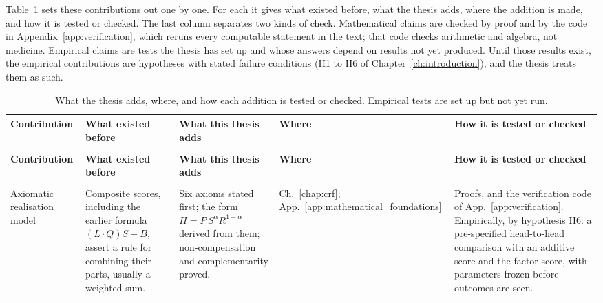 Table~\ref{tab:guide-novelty} sets these contributions out one by one. For
each it gives what existed before, what the thesis adds, where the addition is
made, and how it is tested or checked. The last column separates two kinds of
check. Mathematical claims are checked by proof and by the code in
Appendix~\ref{app:verification}, which reruns every computable statement in the
text; that code checks arithmetic and algebra, not medicine. Empirical claims
are tests the thesis has set up and whose answers depend on results not yet
produced. Until those results exist, the empirical contributions are
hypotheses with stated failure conditions (H1 to H6 of
Chapter~\ref{ch:introduction}), and the thesis treats them as such.

\begingroup
\footnotesize
\setlength{\tabcolsep}{4pt}
\renewcommand{\arraystretch}{1.2}
\begin{longtable}{>{\raggedright\arraybackslash}p{2.4cm} >{\raggedright\arraybackslash}p{3.0cm} >{\raggedright\arraybackslash}p{3.6cm} >{\raggedright\arraybackslash}p{1.4cm} >{\raggedright\arraybackslash}p{3.7cm}}
\caption{What the thesis adds, where, and how each addition is tested or checked. Empirical tests are set up but not yet run.}
\label{tab:guide-novelty}\\
\toprule
\textbf{Contribution} & \textbf{What existed before} & \textbf{What this thesis adds} & \textbf{Where} & \textbf{How it is tested or checked} \\
\midrule
\endfirsthead
\multicolumn{5}{l}{\textit{Table~\ref{tab:guide-novelty} continued}} \\
\toprule
\textbf{Contribution} & \textbf{What existed before} & \textbf{What this thesis adds} & \textbf{Where} & \textbf{How it is tested or checked} \\
\midrule
\endhead
\midrule
\multicolumn{5}{r}{\textit{Continued on next page}} \\
\endfoot
\bottomrule
\endlastfoot
Axiomatic realisation model & Composite scores, including the earlier formula $(L\cdot Q)S-B$, assert a rule for combining their parts, usually a weighted sum. & Six axioms stated first; the form $H=P\,S^{\alpha}R^{1-\alpha}$ derived from them; non-compensation and complementarity proved. & Ch.~\ref{chap:crf}; App.~\ref{app:mathematical_foundations} & Proofs, and the verification code of App.~\ref{app:verification}. Empirically, by hypothesis H6: a pre-specified head-to-head comparison with an additive score and the factor score, with parameters frozen before outcomes are seen. \\

\end{longtable}
